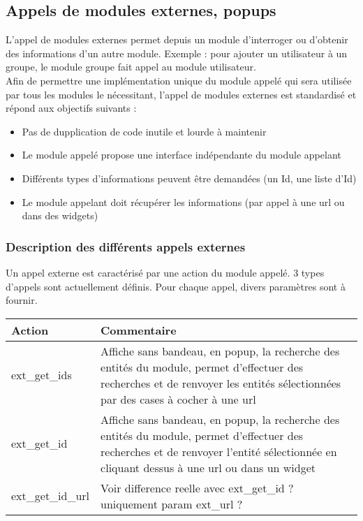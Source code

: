

\subsection{Appels de modules externes, popups}
\label{extmod}

L'appel de modules externes permet depuis un module d'interroger ou d'obtenir des informations d'un autre module.
Exemple : pour ajouter un utilisateur à un groupe, le module groupe fait appel au module utilisateur.\\

Afin de permettre une implémentation unique du module appelé qui sera utilisée par tous les modules le nécessitant, l'appel de modules externes est standardisé et répond aux objectifs suivants :\\
\begin{itemize}
\item Pas de dupplication de code inutile et lourde à maintenir
\item Le module appelé propose une interface indépendante du module appelant
\item Différents types d'informations peuvent être demandées (un Id, une liste d'Id)
\item Le module appelant doit récupérer les informations (par appel à une url ou dans des widgets)
\end{itemize}



\subsubsection{Description des différents appels externes}

Un appel externe est caractérisé par une action du module appelé.
3 types d'appels sont actuellement définis.
Pour chaque appel, divers paramètres sont à fournir.\\

\begin{tabular}{|p{3cm}|p{9.5cm}|}
\hline
\textbf{Action} & \textbf{Commentaire} \\
\hline
ext\_get\_ids & Affiche sans bandeau, en popup, la recherche des entités du module, permet d'effectuer des recherches et de renvoyer les entités sélectionnées par des cases à cocher à une url \\
\hline
ext\_get\_id & Affiche sans bandeau, en popup, la recherche des entités du module, permet d'effectuer des recherches et de renvoyer l'entité sélectionnée en cliquant dessus à une url ou dans un widget\\
\hline
ext\_get\_id\_url & Voir difference reelle avec ext\_get\_id ? uniquement param ext\_url ? \\
\hline
\end{tabular}


